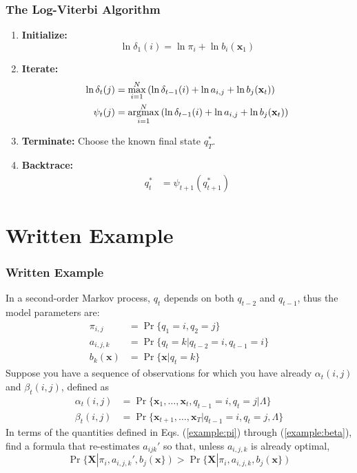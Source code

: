 \documentclass{beamer}
\newcommand{\argmax}{\operatornamewithlimits{argmax}}
\begin{document}
\begin{frame}
  \frametitle{The Log-Viterbi Algorithm}

  \begin{enumerate}
  \item {\bf Initialize:}
    \[
    \ln\delta_1(i) = \ln\pi_i +\ln b_i(\mathbf{x}_1)
    \]
  \item {\bf Iterate:}
    \begin{align*}
      \ln\delta_{t}(j) &= \max_{i=1}^N \left(\ln\delta_{t-1}(i) +\ln a_{i,j}+ \ln b_j(\mathbf{x}_t)\right)\\
      \psi_{t}(j) &= \argmax_{i=1}^N \left(\ln\delta_{t-1}(i) +\ln a_{i,j}+ \ln b_j(\mathbf{x}_t)\right)
    \end{align*}
  \item {\bf Terminate:}
    Choose the known final state $q_T^*$.
  \item {\bf Backtrace:}
    \begin{align*}
      q_t^* &= \psi_{t+1}\left(q_{t+1}^*\right)
    \end{align*}
  \end{enumerate}
\end{frame}

\section[Example]{Written Example}
\setcounter{subsection}{1}

\begin{frame}
  \frametitle{Written Example}

  In a second-order Markov process, $q_t$ depends on both $q_{t-2}$ and
  $q_{t-1}$, thus the model parameters are:
  \begin{align}
    \pi_{i,j} &= \Pr\{q_1=i,q_2=j\}\label{example:pi}\\
    a_{i,j,k} &= \Pr\{q_t=k|q_{t-2}=i,q_{t-1}=i\}\\
    b_k(\mathbf{x}) &= \Pr\{\mathbf{x}|q_t=k\}
  \end{align}
  Suppose you have a sequence of observations for which you have
  already $\alpha_t(i,j)$ and $\beta_t(i,j)$, defined as
  \begin{align}
    \alpha_t(i,j) &= \Pr\{\mathbf{x}_1,\ldots,\mathbf{x}_t,q_{t-1}=i,q_t=j|\Lambda\}\\
    \beta_t(i,j) &= \Pr\{\mathbf{x}_{t+1},\ldots,\mathbf{x}_T|q_{t-1}=i,q_t=j,\Lambda\}\label{example:beta}
  \end{align}
  In terms of the quantities defined in Eqs. (\ref{example:pi})
  through (\ref{example:beta}), find a formula that re-estimates
  $a_{ijk}'$ so that, unless $a_{i,j,k}$ is already optimal, 
  \[
  \Pr\{\mathbf{X}|\pi_i,a_{i,j,k}',b_j(\mathbf{x}\}) > \Pr\{\mathbf{X}|\pi_i,a_{i,j,k},b_j(\mathbf{x}\})
  \]
\end{frame}
\end{document}
